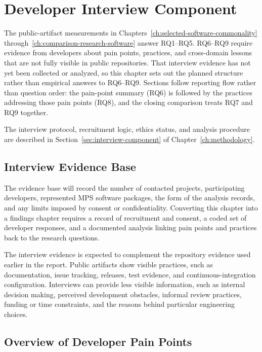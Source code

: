 \chapter{Developer Interview Component}
\label{ch:developer-interviews}

The public-artifact measurements in Chapters~\ref{ch:selected-software-commonality} through~\ref{ch:comparison-research-software} answer RQ1--RQ5. RQ6--RQ9 require evidence from developers about pain points, practices, and cross-domain lessons that are not fully visible in public repositories. That interview evidence has not yet been collected or analyzed, so this chapter sets out the planned structure rather than empirical answers to RQ6--RQ9. Sections follow reporting flow rather than question order: the pain-point summary (RQ6) is followed by the practices addressing those pain points (RQ8), and the closing comparison treats RQ7 and RQ9 together.

The interview protocol, recruitment logic, ethics status, and analysis procedure are described in Section~\ref{sec:interview-component} of Chapter~\ref{ch:methodology}.

\section{Interview Evidence Base}
\label{sec:interview-evidence-base}

The evidence base will record the number of contacted projects, participating developers, represented MPS software packages, the form of the analysis records, and any limits imposed by consent or confidentiality. Converting this chapter into a findings chapter requires a record of recruitment and consent, a coded set of developer responses, and a documented analysis linking pain points and practices back to the research questions.

The interview evidence is expected to complement the repository evidence used earlier in the report. Public artifacts show visible practices, such as documentation, issue tracking, releases, test evidence, and continuous-integration configuration. Interviews can provide less visible information, such as internal decision making, perceived development obstacles, informal review practices, funding or time constraints, and the reasons behind particular engineering choices.

\section{Overview of Developer Pain Points}
\label{sec:developer-pain-points-overview}

